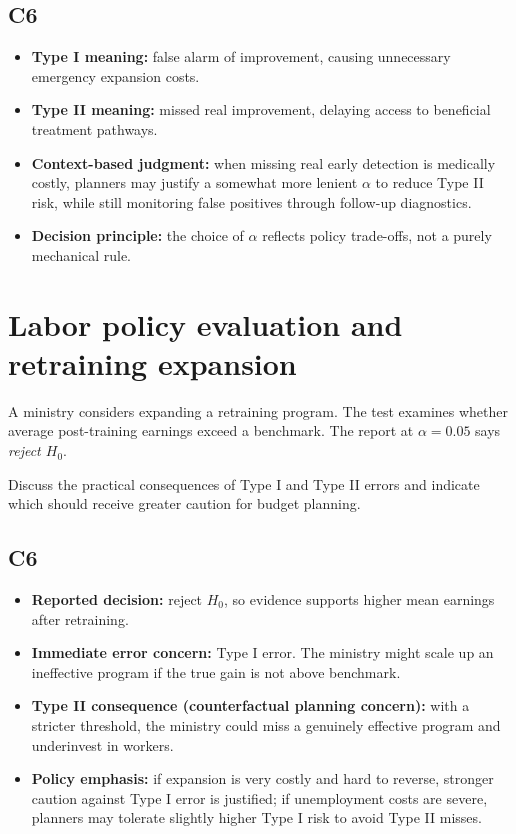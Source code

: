 \begin{ExamProblems}
\subsection*{C6}
\begin{itemize}
    \item \textbf{Type I meaning:} false alarm of improvement, causing unnecessary emergency expansion costs.
    \item \textbf{Type II meaning:} missed real improvement, delaying access to beneficial treatment pathways.
    \item \textbf{Context-based judgment:} when missing real early detection is medically costly, planners may justify a somewhat more lenient \(\alpha\) to reduce Type II risk, while still monitoring false positives through follow-up diagnostics.
    \item \textbf{Decision principle:} the choice of \(\alpha\) reflects policy trade-offs, not a purely mechanical rule.
\end{itemize}

\item
\section{Labor policy evaluation and retraining expansion}
A ministry considers expanding a retraining program. The test examines whether average post-training earnings exceed a benchmark. The report at \(\alpha=0.05\) says \textit{reject \(H_0\)}.

Discuss the practical consequences of Type I and Type II errors and indicate which should receive greater caution for budget planning.

\subsection*{C6}
\begin{itemize}
    \item \textbf{Reported decision:} reject \(H_0\), so evidence supports higher mean earnings after retraining.
    \item \textbf{Immediate error concern:} Type I error. The ministry might scale up an ineffective program if the true gain is not above benchmark.
    \item \textbf{Type II consequence (counterfactual planning concern):} with a stricter threshold, the ministry could miss a genuinely effective program and underinvest in workers.
    \item \textbf{Policy emphasis:} if expansion is very costly and hard to reverse, stronger caution against Type I error is justified; if unemployment costs are severe, planners may tolerate slightly higher Type I risk to avoid Type II misses.
\end{itemize}


\end{ExamProblems}
